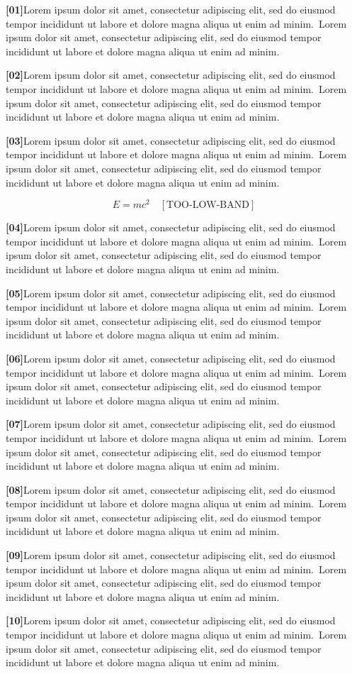 \documentclass[twocolumn]{article}
\newcommand\Body{Lorem ipsum dolor sit amet, consectetur adipiscing elit, sed do
eiusmod tempor incididunt ut labore et dolore magna aliqua ut enim ad minim.}
\newcommand\Par[1]{\par\noindent\textbf{[#1]}\space\Body\ \Body\par\medskip}
\begin{document}
\Par{01}\Par{02}\Par{03}
\begin{wideband}[492pt]\[ E=mc^2 \quad[\text{TOO-LOW-BAND}] \]\end{wideband}
\Par{04}\Par{05}\Par{06}\Par{07}\Par{08}\Par{09}\Par{10}
\end{document}

